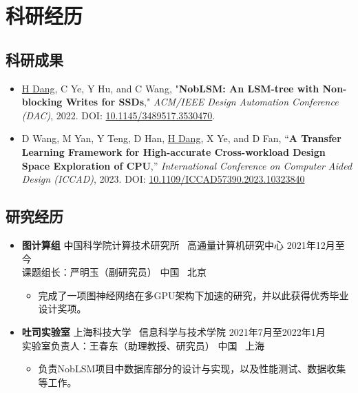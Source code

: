 \documentclass[a4paper,10pt]{ctexart} %
\begin{document}
\section{科研经历}

    \subsection{科研成果}

        \begin{itemize}
            \item \underline{H Dang}, C Ye, Y Hu, and C Wang, "\textbf{NobLSM: An LSM-tree with Non-blocking Writes for SSDs}," \textit{ACM/IEEE Design Automation Conference (DAC)}, 2022. DOI: \href{https://doi.org/10.1145/3489517.3530470}{10.1145/3489517.3530470}.
            \item D Wang, M Yan, Y Teng, D Han, \underline{H Dang}, X Ye, and D Fan, “\textbf{A Transfer Learning Framework for High-accurate Cross-workload Design Space Exploration of CPU},” \textit{International Conference on Computer Aided Design (ICCAD)}, 2023. DOI: \href{https://doi.org/10.1109/ICCAD57390.2023.10323840}{10.1109/ICCAD57390.2023.10323840}
        \end{itemize}

    \subsection{研究经历}

    \begin{itemize}
        \item \textbf{图计算组} \quad 中国科学院计算技术研究所 \, 高通量计算机研究中心 \hfill 2021年12月至今 \\
        {\small 课题组长：严明玉（副研究员）} \hfill 中国 \, 北京
        \begin{small}
            \begin{itemize}
                \item 完成了一项图神经网络在多GPU架构下加速的研究，并以此获得优秀毕业设计奖项。
            \end{itemize}
        \end{small}
    \end{itemize}

    \begin{itemize}
        \item \textbf{吐司实验室} \quad 上海科技大学 \, 信息科学与技术学院 \hfill 2021年7月至2022年1月 \\
        {\small 实验室负责人：王春东（助理教授、研究员）} \hfill 中国 \, 上海
        \begin{small}
            \begin{itemize}
                \item 负责NobLSM项目中数据库部分的设计与实现，以及性能测试、数据收集等工作。
            \end{itemize}
        \end{small}
    \end{itemize}
\end{document}
